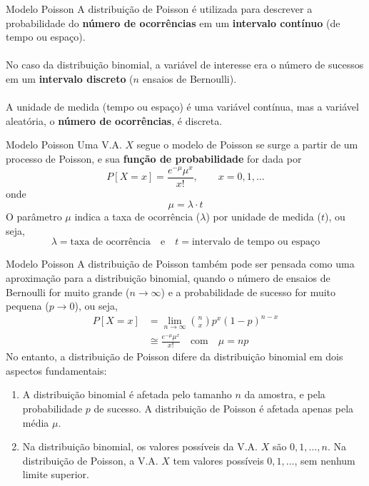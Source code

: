 \documentclass[10pt]{beamer}\usepackage[]{graphicx}\usepackage[]{color}
\providecommand{\E}{\text{E}}
\providecommand{\Var}{\text{Var}}
\theoremstyle{definition}
\begin{document}
\begin{frame}[fragile]{Modelo Poisson}
  A distribuição de Poisson é utilizada para descrever
  a probabilidade do \textbf{número de ocorrências} em um \textbf{intervalo
  contínuo} (de tempo ou espaço). \\~\\
  No caso da distribuição binomial, a variável de interesse era o número
  de sucessos em um \textbf{intervalo discreto} ($n$ ensaios de
  Bernoulli). \\~\\
  A unidade de medida (tempo ou espaço) é uma variável contínua, mas a
  \textsf{variável aleatória}, o \textbf{número de ocorrências}, é
  discreta.
\end{frame}

\begin{frame}[fragile]{Modelo Poisson}
  Uma V.A. $X$ segue o modelo de Poisson se surge a partir de um
  processo de Poisson, e sua \textbf{função de probabilidade} for dada
  por
  \begin{equation*}
    P[X = x] = \frac{e^{-\mu} \mu^x}{x!}, \quad \quad x = 0, 1, \ldots
  \end{equation*}
  onde
  \begin{equation*}
    \mu = \lambda \cdot t
  \end{equation*}
  O parâmetro $\mu$ indica a taxa de ocorrência ($\lambda$) por unidade
  de medida ($t$), ou seja, %
  \begin{equation*}
    \lambda = \text{taxa de ocorrência} \quad \text{e} \quad t =
    \text{intervalo de tempo ou espaço}
  \end{equation*}
\end{frame}

\begin{frame}[fragile]{Modelo Poisson}
  \small
  A distribuição de Poisson também pode ser pensada como uma aproximação
  para a distribuição binomial, quando o número de ensaios de Bernoulli
  for muito grande ($n \rightarrow \infty$) e a probabilidade de sucesso
  for muito pequena ($p \rightarrow 0$), ou seja,
  \begin{align*}
    P[X=x] &= \lim_{n \rightarrow \infty} \binom{n}{x} p^x (1-p)^{n-x} \\
           &\cong \frac{e^{-\mu} \mu^x}{x!} \quad \text{com} \quad \mu
           = np
  \end{align*}
  No entanto, a distribuição de Poisson difere da distribuição binomial
  em dois aspectos fundamentais:
  \begin{enumerate}
  \item A distribuição binomial é afetada pelo tamanho $n$ da amostra, e
    pela probabilidade $p$ de sucesso. A distribuição de Poisson é
    afetada apenas pela média $\mu$.
  \item Na distribuição binomial, os valores possíveis da V.A. $X$ são
    $0, 1, \ldots, n$. Na distribuição de Poisson, a V.A. $X$ tem
    valores possíveis $0, 1, \ldots$, sem nenhum limite superior.
  \end{enumerate}
\end{frame}
\end{document}
